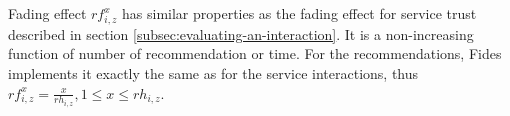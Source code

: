 Fading effect $rf^{x}_{i, z}$ has similar properties as the fading effect for service trust described in section \ref{subsec:evaluating-an-interaction}. It is a non-increasing function of number of recommendation or time. 
For the recommendations, Fides implements it exactly the same as for the service interactions, thus $rf^{x}_{i, z} = \frac{x}{rh_{i, z}}, 1 \leq x \leq rh_{i,z}$.
